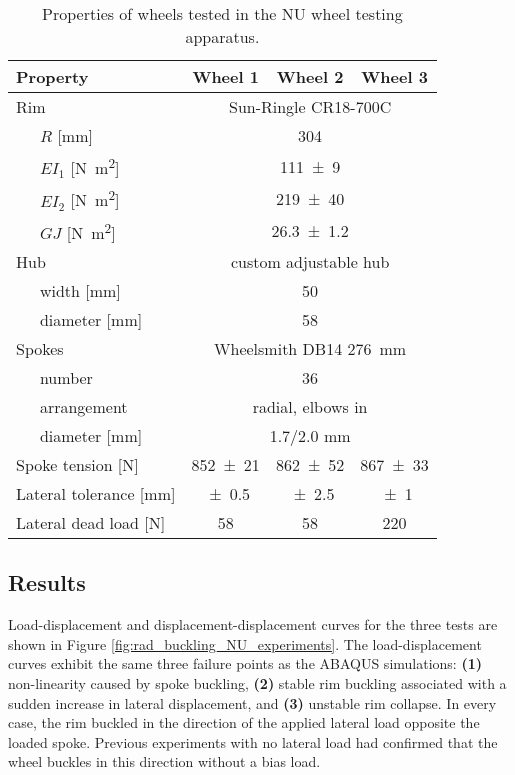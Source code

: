 \documentclass[\rootdir/thesis.tex]{subfiles}
\begin{document}
\begin{table}
\caption{Properties of wheels tested in the NU wheel testing apparatus.}
\label{tab:rad_buckling_wheels}
\begin{tabular}{llccc}
\hline
\multicolumn{2}{l}{\bf Property}& \bf Wheel 1& \bf Wheel 2& \bf Wheel 3\\
\hline
\multicolumn{2}{l}{Rim}& \multicolumn{3}{c}{Sun-Ringle CR18-700C}\\
\,& $R$ [\si{mm}] & \multicolumn{3}{c}{\num{304}}\\
\,& $EI_1$ [\si{N.m^2}]     & \multicolumn{3}{c}{\num{111+-9}}\\
\,& $EI_2$ [\si{N.m^2}]     & \multicolumn{3}{c}{\num{219+-40}}\\
\,& $GJ$   [\si{N.m^2}]     & \multicolumn{3}{c}{\num{26.3+-1.2}}\\
\hline
\multicolumn{2}{l}{Hub}& \multicolumn{3}{c}{custom adjustable hub}\\
\,& width [\si{mm}]    & \multicolumn{3}{c}{50}\\
\,& diameter [\si{mm}] & \multicolumn{3}{c}{58}\\
\hline
\multicolumn{2}{l}{Spokes}& \multicolumn{3}{c}{Wheelsmith DB14 \SI{276}{mm}}\\
\,& number             & \multicolumn{3}{c}{36}\\
\,& arrangement        & \multicolumn{3}{c}{radial, elbows in}\\
\,& diameter [\si{mm}] & \multicolumn{3}{c}{1.7/2.0 \si{mm}}\\
\hline
\multicolumn{2}{l}{Spoke tension [\si{N}]}      & \num{852+-21} & \num{862+-52} & \num{867+-33}\\
\multicolumn{2}{l}{Lateral tolerance [\si{mm}]} & \num{+-0.5} & \num{+-2.5} & \num{+-1}\\
\multicolumn{2}{l}{Lateral dead load [\si{N}]}  & \num{58} & \num{58} & \num{220}\\
\hline
\end{tabular}
\end{table}

\subsection{Results}

Load-displacement and displacement-displacement curves for the three tests are shown in Figure \ref{fig:rad_buckling_NU_experiments}. The load-displacement curves exhibit the same three failure points as the ABAQUS simulations: \textbf{(1)} non-linearity caused by spoke buckling, \textbf{(2)} stable rim buckling associated with a sudden increase in lateral displacement, and \textbf{(3)} unstable rim collapse. In every case, the rim buckled in the direction of the applied lateral load opposite the loaded spoke. Previous experiments with no lateral load had confirmed that the wheel buckles in this direction without a bias load.
\end{document}
